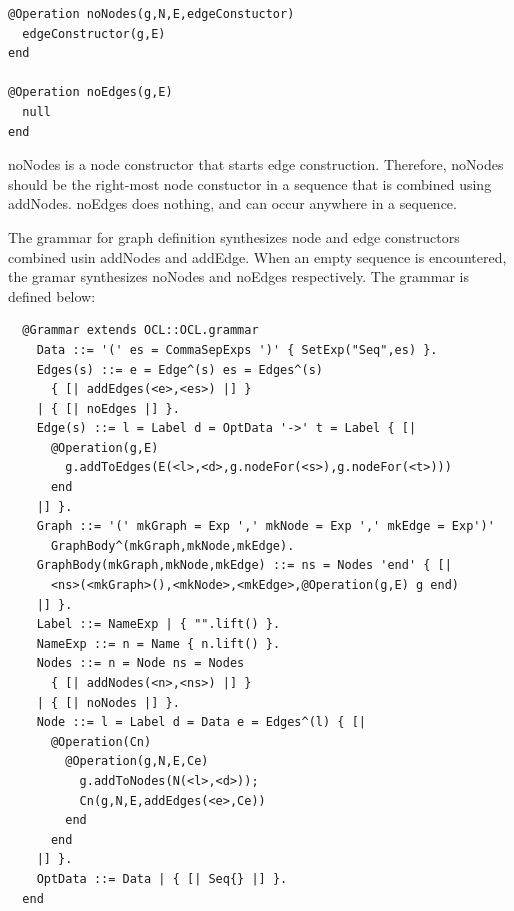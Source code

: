 \begin{lstlisting}
@Operation noNodes(g,N,E,edgeConstuctor)
  edgeConstructor(g,E)
end

@Operation noEdges(g,E)
  null
end
\end{lstlisting}
noNodes is a node constructor that starts edge construction. Therefore,
noNodes should be the right-most node constuctor in a sequence that
is combined using addNodes. noEdges does nothing, and can occur anywhere
in a sequence.

The grammar for graph definition synthesizes node and edge constructors
combined usin addNodes and addEdge. When an empty sequence is encountered,
the gramar synthesizes noNodes and noEdges respectively. The grammar
is defined below:

\begin{lstlisting}
  @Grammar extends OCL::OCL.grammar
    Data ::= '(' es = CommaSepExps ')' { SetExp("Seq",es) }.
    Edges(s) ::= e = Edge^(s) es = Edges^(s) 
      { [| addEdges(<e>,<es>) |] } 
    | { [| noEdges |] }.
    Edge(s) ::= l = Label d = OptData '->' t = Label { [| 
      @Operation(g,E)
        g.addToEdges(E(<l>,<d>,g.nodeFor(<s>),g.nodeFor(<t>)))
      end 
    |] }.
    Graph ::= '(' mkGraph = Exp ',' mkNode = Exp ',' mkEdge = Exp')' 
      GraphBody^(mkGraph,mkNode,mkEdge).
    GraphBody(mkGraph,mkNode,mkEdge) ::= ns = Nodes 'end' { [| 
      <ns>(<mkGraph>(),<mkNode>,<mkEdge>,@Operation(g,E) g end) 
    |] }.
    Label ::= NameExp | { "".lift() }.
    NameExp ::= n = Name { n.lift() }.
    Nodes ::= n = Node ns = Nodes 
      { [| addNodes(<n>,<ns>) |] } 
    | { [| noNodes |] }.
    Node ::= l = Label d = Data e = Edges^(l) { [|
      @Operation(Cn)
        @Operation(g,N,E,Ce)
          g.addToNodes(N(<l>,<d>));
          Cn(g,N,E,addEdges(<e>,Ce))
        end
      end
    |] }.
    OptData ::= Data | { [| Seq{} |] }.
  end
\end{lstlisting}